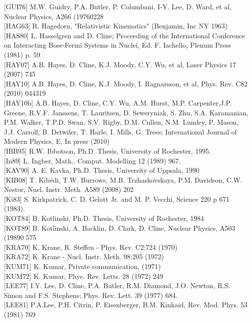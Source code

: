 \documentclass[10pt]{article}
\begin{document}
[GUI76] M.W. Guidry, P.A. Butler, P. Columbani, I-Y. Lee, D. Ward, et al, Nuclear Physics, A266 (19760228\\[0pt]
[HAG63] R. Hagedorn, "Relativistic Kinematics" (Benjamin, Inc NY 1963)\\[0pt]
[HAS80] L. Hasselgren and D. Cline; Proceeding of the International Conference on Interacting Bose-Fermi Systems in Nuclei, Ed. F. Iachello, Plenum Press (1981) p. 59\\[0pt]
[HAY07] A.B. Hayes, D. Cline, K.J. Moody, C.Y. Wu, et al, Laser Physics 17 (2007) 745\\[0pt]
[HAY10] A.B. Hayes, D. Cline, K.J. Moody, I. Ragnarsson, et al, Phys. Rev. C82 (2010) 044319\\[0pt]
[HAY10b] A.B. Hayes, D. Cline, C.Y. Wu, A.M. Hurst, M.P. Carpenter,J.P. Greene, R.V.F. Janssens, T. Lauritsen, D. Seweryniak, S. Zhu, S.A. Karamanian, P.M. Walker, T.P.D. Swan, S.V. Rigby, D.M. Cullen, N.M. Lumley, P. Mason, J.J. Carroll, B. Detwiler, T. Harle, I. Mills, G. Trees; International Journal of Modern Physics, E, In press (2010)\\[0pt]
[IBB95] R.W. Ibbotson, Ph.D. Thesis, University of Rochester, 1995.\\[0pt]
[In89] L. Ingber, Math.. Comput. Modelling 12 (1989) 967.\\[0pt]
[KAV90] A. E. Kavka, Ph.D. Thesis, University of Uppsala, 1990\\[0pt]
[KIB08] T. Kibédi, T.W. Burrows, M.B. Trzhaskovskaya, P.M. Davidson, C.W. Nestor, Nucl. Instr. Meth. A589 (2008) 202\\[0pt]
[Ki83] S. Kirkpatrick, C. D. Gelatt Jr. and M. P. Vecchi, Science 220 p 671 (1983).\\[0pt]
[KOT84] B. Kotlinski, Ph.D. Thesis, University of Rochester, 1984\\[0pt]
[KOT89] B. Kotlinski, A. Backlin, D. Clark, D. Cline, Nuclear Physics, A503 (19890 575\\[0pt]
[KRA70] K. Krane, R. Steffen - Phys. Rev. C2:724 (1970)\\[0pt]
[KRA72] K. Krane - Nucl. Instr. Meth. 98:205 (1972)\\[0pt]
[KUM71] K. Kumar, Private communication, (1971)\\[0pt]
[KUM72] K. Kumar, Phys. Rev. Letts. 28 (1972) 249\\[0pt]
[LEE77] I.Y. Lee, D. Cline, P.A. Butler, R.M. Diamond, J.O. Newton, R.S. Simon and F.S. Stephens; Phys. Rev. Lett. 39 (1977) 684.\\[0pt]
[LEE81] P.A.Lee, P.H. Citrin, P. Eisenberger, B.M. Kinkaid, Rev. Mod. Phys. 53 (1981) 769\\[0pt]
\end{document}
